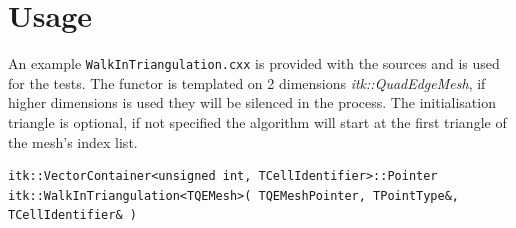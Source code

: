 \documentclass{InsightArticle}
\begin{document}
\section{Usage}

An example \texttt{WalkInTriangulation.cxx} is provided with the sources and is used for the tests. The functor is templated on 2 dimensions \textit{itk::QuadEdgeMesh}, if higher dimensions is used they will be silenced in the process. The initialisation triangle is optional, if not specified the algorithm will start at the first triangle of the mesh's index list.
\begin{verbatim}
itk::VectorContainer<unsigned int, TCellIdentifier>::Pointer
itk::WalkInTriangulation<TQEMesh>( TQEMeshPointer, TPointType&, TCellIdentifier& )
\end{verbatim}


%
%



\end{document}
